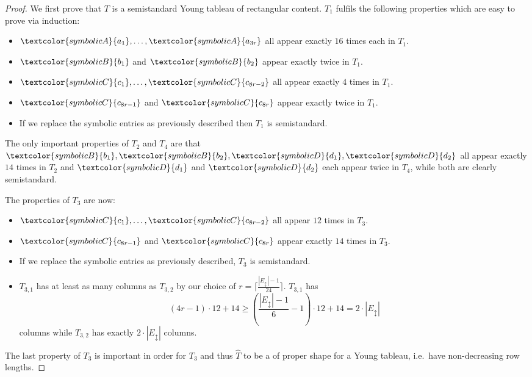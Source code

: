 \documentclass[10pt,a4paper]{article}
\numberwithin{equation}{section}
\theoremstyle{definition}
\newcommand{\Evert}{{\ensuremath{E_{\updownarrow}}}}
\begin{document}
\begin{proof}
    We first prove that $T$ is a semistandard Young tableau of rectangular content.
    $T_1$ fulfils the following properties which are easy to prove via induction:
    \begin{itemize}
        \item $\textcolor{symbolicA}{a_1}, \ldots, \textcolor{symbolicA}{a_{3r}}$ all appear exactly $16$ times each in $T_1$.
        \item $\textcolor{symbolicB}{b_1}$ and $\textcolor{symbolicB}{b_2}$ appear exactly twice in $T_1$.
        \item $\textcolor{symbolicC}{c_1}, \ldots, \textcolor{symbolicC}{c_{8r-2}}$ all appear exactly $4$ times in $T_1$.
        \item $\textcolor{symbolicC}{c_{8r-1}}$ and $\textcolor{symbolicC}{c_{8r}}$ appear exactly twice in $T_1$.
        \item If we replace the symbolic entries as previously described then $T_1$ is semistandard.
    \end{itemize}
    
    The only important properties of $T_2$ and $T_4$ are that $\textcolor{symbolicB}{b_1}, \textcolor{symbolicB}{b_2}, \textcolor{symbolicD}{d_1}, \textcolor{symbolicD}{d_2}$ all appear exactly $14$ times in $T_2$ and $\textcolor{symbolicD}{d_1}$ and $\textcolor{symbolicD}{d_2}$ each appear twice in $T_4$, while both are clearly semistandard.
    
    The properties of $T_3$ are now:
    \begin{itemize}
        \item $\textcolor{symbolicC}{c_1}, \ldots, \textcolor{symbolicC}{c_{8r-2}}$ all appear $12$ times in $T_3$.
        \item $\textcolor{symbolicC}{c_{8r-1}}$ and $\textcolor{symbolicC}{c_{8r}}$ appear exactly $14$ times in $T_3$.
        \item If we replace the symbolic entries as previously described, $T_3$ is semistandard.
        \item $T_{3,1}$ has at least as many columns as $T_{3,2}$ by our choice of $r = \lceil \frac{|\Evert| - 1}{24} \rceil$.
            $T_{3,1}$ has \[
                (4r-1) \cdot 12 + 14 \geq \left(\frac{|\Evert|-1}{6}-1\right)\cdot 12 + 14 = 2 \cdot |\Evert|
            \]
            columns while $T_{3,2}$ has exactly $2 \cdot |\Evert|$ columns.
    \end{itemize}
    The last property of $T_3$ is important in order for $T_3$ and thus $\hat{T}$ to be a of proper shape for a Young tableau, i.e.\ have non-decreasing row lengths.
    

\end{proof}
\end{document}
